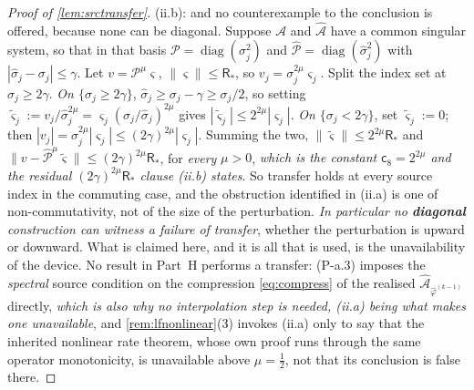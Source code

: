 \begin{proof}[Proof of \cref{lem:srctransfer}]
(ii.b): and no counterexample to the conclusion is offered, because none can be diagonal.
Suppose $\mathcal A$ and $\hat{\mathcal A}$ have a common singular system, so that in that basis
$\mathcal P=\operatorname{diag}(\sigma_j^{2})$ and
$\hat{\mathcal P}=\operatorname{diag}(\hat\sigma_j^{2})$ with $|\hat\sigma_j-\sigma_j|\le\gamma$. Let
$v=\mathcal P^{\mu}\varsigma$, $\|\varsigma\|\le\mathsf R_\ast$, so $v_j=\sigma_j^{2\mu}\varsigma_j$. Split
the index set at $\sigma_j\ge2\gamma$. \emph{On $\{\sigma_j\ge2\gamma\}$}, $\hat\sigma_j\ge\sigma_j-\gamma\ge\sigma_j/2$,
so setting $\tilde\varsigma_j:=v_j/\hat\sigma_j^{2\mu}=\varsigma_j(\sigma_j/\hat\sigma_j)^{2\mu}$ gives
$|\tilde\varsigma_j|\le2^{2\mu}|\varsigma_j|$. \emph{On $\{\sigma_j<2\gamma\}$}, set
$\tilde\varsigma_j:=0$; then $|v_j|=\sigma_j^{2\mu}|\varsigma_j|\le(2\gamma)^{2\mu}|\varsigma_j|$.
Summing the two, $\|\tilde\varsigma\|\le2^{2\mu}\mathsf R_\ast$ and
$\|v-\hat{\mathcal P}^{\mu}\tilde\varsigma\|\le(2\gamma)^{2\mu}\mathsf R_\ast$, for \emph{every}
$\mu>0$, \emph{which is the constant $\mathsf c_8=2^{2\mu}$ and the residual
$(2\gamma)^{2\mu}\mathsf R_\ast$ clause \textup{(ii.b)} states}.
So transfer holds at every source index in the commuting case, and the obstruction identified in
(ii.a) is one of non-commutativity, not of the size of the perturbation. \emph{In particular no
\textbf{diagonal} construction can witness a failure of transfer}, whether the perturbation is upward or
downward.
What is claimed here, and it is all that is used, is the unavailability of the device. No result
in Part~H performs a transfer: (P-a.3) imposes the \emph{spectral} source condition on the compression
\eqref{eq:compress} of the realised $\hat{\mathcal A}_{\hat\varphi^{(k-1)}}$ directly, \emph{which is
also why no interpolation step is needed, (ii.a) being what makes one unavailable}, and
\cref{rem:lfnonlinear}(3) invokes (ii.a) only to
say that the inherited nonlinear rate theorem, whose own proof runs through the same operator
monotonicity, is unavailable above $\mu=\tfrac12$, not that its conclusion is false there.


\end{proof}
